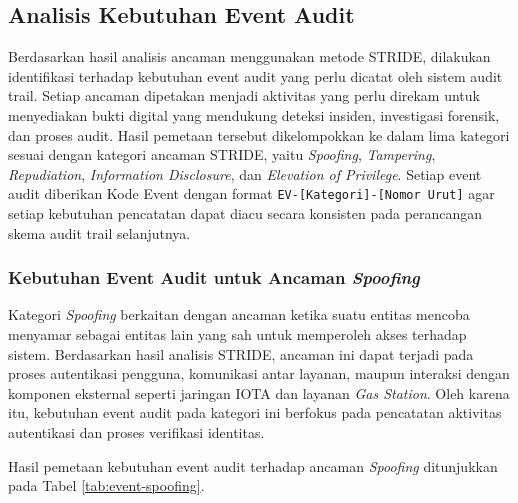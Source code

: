 \subsection{Analisis Kebutuhan Event Audit}

Berdasarkan hasil analisis ancaman menggunakan metode STRIDE, dilakukan identifikasi terhadap kebutuhan event audit yang perlu dicatat oleh sistem audit trail. Setiap ancaman dipetakan menjadi aktivitas yang perlu direkam untuk menyediakan bukti digital yang mendukung deteksi insiden, investigasi forensik, dan proses audit. Hasil pemetaan tersebut dikelompokkan ke dalam lima kategori sesuai dengan kategori ancaman STRIDE, yaitu \textit{Spoofing}, \textit{Tampering}, \textit{Repudiation}, \textit{Information Disclosure}, dan \textit{Elevation of Privilege}. Setiap event audit diberikan Kode Event dengan format \texttt{EV-[Kategori]-[Nomor Urut]} agar setiap kebutuhan pencatatan dapat diacu secara konsisten pada perancangan skema audit trail selanjutnya.

\subsubsection{Kebutuhan Event Audit untuk Ancaman \textit{Spoofing}}

Kategori \textit{Spoofing} berkaitan dengan ancaman ketika suatu entitas mencoba menyamar sebagai entitas lain yang sah untuk memperoleh akses terhadap sistem. Berdasarkan hasil analisis STRIDE, ancaman ini dapat terjadi pada proses autentikasi pengguna, komunikasi antar layanan, maupun interaksi dengan komponen eksternal seperti jaringan IOTA dan layanan \textit{Gas Station}. Oleh karena itu, kebutuhan event audit pada kategori ini berfokus pada pencatatan aktivitas autentikasi dan proses verifikasi identitas.

Hasil pemetaan kebutuhan event audit terhadap ancaman \textit{Spoofing} ditunjukkan pada Tabel \ref{tab:event-spoofing}.

